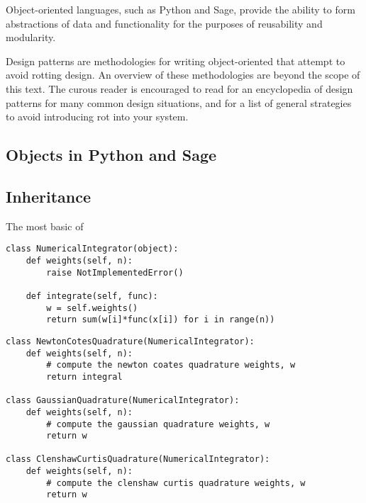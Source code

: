 Object-oriented languages, such as Python and Sage, provide the ability to form
abstractions of data and functionality for the purposes of reusability and
modularity. %

Design patterns are methodologies for writing object-oriented that attempt to
avoid rotting design. An overview of these methodologies are beyond the scope of
this text. The curous reader is encouraged to read \cite{gamma1995design} for an
encyclopedia of design patterns for many common design situations, and
\cite{martin2000design} for a list of general strategies to avoid introducing
rot into your system.

\subsection{Objects in Python and Sage}

\subsection{Inheritance}

The most basic of

\begin{lstlisting}
class NumericalIntegrator(object):
    def weights(self, n):
        raise NotImplementedError()

    def integrate(self, func):
        w = self.weights()
        return sum(w[i]*func(x[i]) for i in range(n))
\end{lstlisting}


\begin{lstlisting}
class NewtonCotesQuadrature(NumericalIntegrator):
    def weights(self, n):
        # compute the newton coates quadrature weights, w
        return integral

class GaussianQuadrature(NumericalIntegrator):
    def weights(self, n):
        # compute the gaussian quadrature weights, w
        return w

class ClenshawCurtisQuadrature(NumericalIntegrator):
    def weights(self, n):
        # compute the clenshaw curtis quadrature weights, w
        return w
         
\end{lstlisting}


